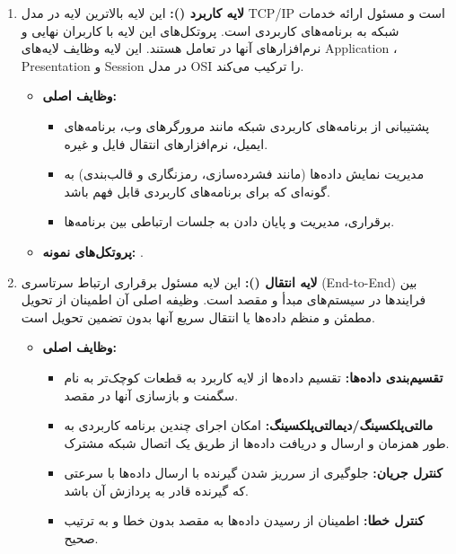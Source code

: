 \begin{enumerate}
	\item \textbf{لایه کاربرد ():}
	این لایه بالاترین لایه در مدل TCP/IP است و مسئول ارائه خدمات شبکه به برنامه‌های کاربردی است. پروتکل‌های این لایه با کاربران نهایی و نرم‌افزارهای آنها در تعامل هستند. این لایه وظایف لایه‌های Application ، Presentation و Session در مدل OSI را ترکیب می‌کند.

	\begin{itemize}
		\item \textbf{وظایف اصلی:}
		\begin{itemize}
			\item پشتیبانی از برنامه‌های کاربردی شبکه مانند مرورگرهای وب، برنامه‌های ایمیل، نرم‌افزارهای انتقال فایل و غیره.
			
			\item مدیریت نمایش داده‌ها (مانند فشرده‌سازی، رمزنگاری و قالب‌بندی) به گونه‌ای که برای برنامه‌های کاربردی قابل فهم باشد.
			
			\item برقراری، مدیریت و پایان دادن به جلسات ارتباطی بین برنامه‌ها.
		\end{itemize}
		
		\item \textbf{پروتکل‌های نمونه:} .
	\end{itemize}
	
	\item \textbf{لایه انتقال ():}
	این لایه مسئول برقراری ارتباط سرتاسری (End-to-End) بین فرایندها در سیستم‌های مبدأ و مقصد است. وظیفه اصلی آن اطمینان از تحویل مطمئن و منظم داده‌ها یا انتقال سریع آنها بدون تضمین تحویل است.
	\begin{itemize}
		\item \textbf{وظایف اصلی:}
		\begin{itemize}
			\item \textbf{تقسیم‌بندی داده‌ها:} تقسیم داده‌ها از لایه کاربرد به قطعات کوچک‌تر به نام سگمنت و بازسازی آنها در مقصد.
			
			\item \textbf{مالتی‌پلکسینگ/دیمالتی‌پلکسینگ:} امکان اجرای چندین برنامه کاربردی به طور همزمان و ارسال و دریافت داده‌ها از طریق یک اتصال شبکه مشترک.
			
			\item \textbf{کنترل جریان:} جلوگیری از سرریز شدن گیرنده با ارسال داده‌ها با سرعتی که گیرنده قادر به پردازش آن باشد.
			
			\item \textbf{کنترل خطا:} اطمینان از رسیدن داده‌ها به مقصد بدون خطا و به ترتیب صحیح.
		\end{itemize}
		

\end{itemize}
\end{enumerate}
